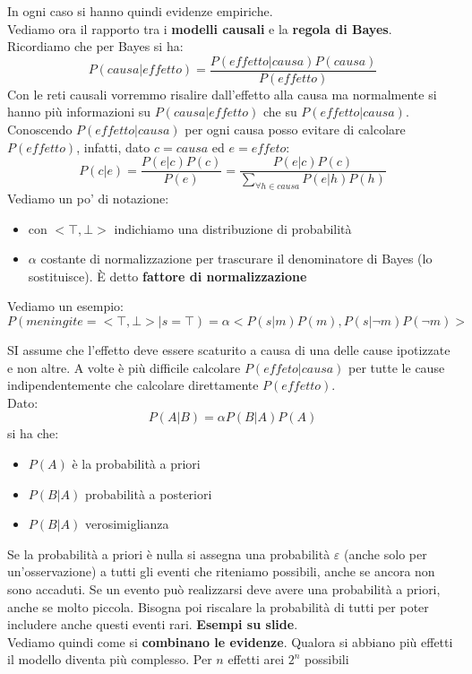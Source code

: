 \message{ !name(modprob.tex)}\documentclass[a4paper,12pt, oneside]{book}
\begin{document}
In ogni caso si hanno quindi evidenze empiriche.\\
Vediamo ora il rapporto tra i \textbf{modelli causali} e la \textbf{regola di
  Bayes}.\\
Ricordiamo che per Bayes si ha:
\[P(causa|effetto)=\frac{P(effetto|causa)P(causa)}{P(effetto)}\]
Con le reti causali vorremmo risalire dall'effetto alla causa ma normalmente si
hanno più informazioni su $P(causa|effetto)$ che su $P(effetto|causa)$.\\
Conoscendo $P(effetto|causa)$ per ogni causa posso evitare di calcolare
$P(effetto)$, infatti, dato $c=causa$ ed $e=effeto$:
\[P(c|e)=\frac{P(e|c)P(c)}{P(e)}=\frac{P(e|c)P(c)}{\sum_{\forall h\in
      causa}P(e|h)P(h)}\] 
Vediamo un po' di notazione:
\begin{itemize}
  \item con $<\top,\bot>$ indichiamo una distribuzione di probabilità
  \item $\alpha$ costante di normalizzazione per trascurare il denominatore di
  Bayes (lo sostituisce). È detto \textbf{fattore di normalizzazione}
\end{itemize}
\begin{esempio}
  Vediamo un esempio:
  \[P(meningite=<\top,\bot>|s=\top)=\alpha<P(s|m)P(m),P(s|\neg m)P(\neg m)>\]
\end{esempio}
SI assume che l'effetto deve essere scaturito a causa di una delle cause
ipotizzate e non altre. A volte è più difficile calcolare $P(effeto|causa)$ per
tutte le cause indipendentemente che calcolare direttamente $P(effetto)$.\\
Dato:
\[P(A|B)=\alpha P(B|A)P(A)\]
si ha che:
\begin{itemize}
  \item $P(A)$ è la probabilità a priori
  \item $P(B|A)$ probabilità a posteriori
  \item $P(B|A)$ verosimiglianza
\end{itemize}
Se la probabilità a priori è nulla si assegna una probabilità $\varepsilon$
(anche solo per un'osservazione) a tutti gli eventi che riteniamo possibili,
anche se ancora non sono accaduti. Se un evento può realizzarsi deve avere una
probabilità a priori, anche se molto piccola. Bisogna poi riscalare la
probabilità di tutti per poter includere anche questi eventi
rari. \textbf{Esempi su slide}.\\
Vediamo quindi come si \textbf{combinano le evidenze}. Qualora si abbiano più
effetti il modello diventa più complesso. Per $n$ effetti arei $2^n$ possibili
\end{document}
